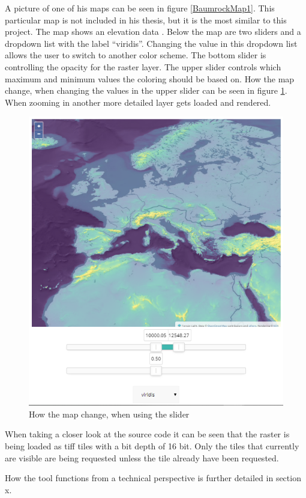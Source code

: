 A picture of one of his maps can be seen in figure \ref{BaumrockMap1}. This particular map is not included in his thesis, but it is the most similar to this project. The map shows an elevation data . Below the map are two sliders and a dropdown list with the label “viridis”. Changing the value in this dropdown list allows the user to switch to another color scheme. The bottom slider is controlling the opacity for the raster layer. The upper slider controls which maximum and minimum values the coloring should be based on. How the map change, when changing the values in the upper slider can be seen in figure \ref{BaumrockMap2}. When zooming in another more detailed layer gets loaded and rendered.
\begin{figure} [H]
	\centering
	\includegraphics[width=.8\textwidth]{Pictures/BaumrockMap2}
	\caption{How the map change, when using the slider}
	\label{BaumrockMap2}
\end{figure}

When taking a closer look at the source code it can be seen that the raster is being loaded as tiff tiles with a bit depth of 16 bit. \citep{EOX} Only the tiles that currently are visible are being requested unless the tile already have been requested. \citep{Buamrocks}

How the tool functions from a technical perspective is further detailed in section x.
